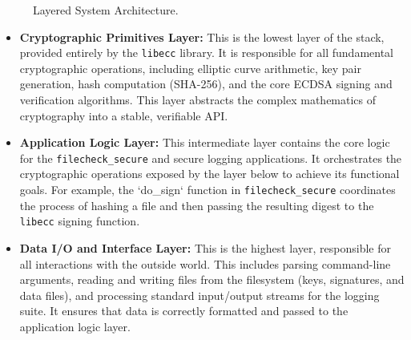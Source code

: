 \documentclass[12pt, letterpaper]{article}
\begin{document}
\begin{figure}[h!]
	\centering
	\caption{Layered System Architecture.}
	\label{fig:architecture}
\end{figure}

\begin{itemize}
	\item \textbf{Cryptographic Primitives Layer:} This is the lowest layer of the stack, provided entirely by the \texttt{libecc} library. It is responsible for all fundamental cryptographic operations, including elliptic curve arithmetic, key pair generation, hash computation (SHA-256), and the core ECDSA signing and verification algorithms. This layer abstracts the complex mathematics of cryptography into a stable, verifiable API.
	
	\item \textbf{Application Logic Layer:} This intermediate layer contains the core logic for the \texttt{filecheck\_secure} and secure logging applications. It orchestrates the cryptographic operations exposed by the layer below to achieve its functional goals. For example, the `do\_sign` function in \texttt{filecheck\_secure} coordinates the process of hashing a file and then passing the resulting digest to the \texttt{libecc} signing function.
	
	\item \textbf{Data I/O and Interface Layer:} This is the highest layer, responsible for all interactions with the outside world. This includes parsing command-line arguments, reading and writing files from the filesystem (keys, signatures, and data files), and processing standard input/output streams for the logging suite. It ensures that data is correctly formatted and passed to the application logic layer.
\end{itemize}
\end{document}
